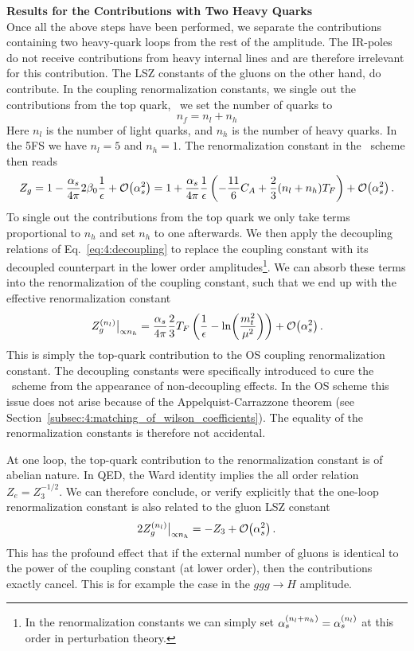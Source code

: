 \textbf{Results for the Contributions with Two Heavy Quarks} \\
Once all the above steps have been performed, we separate the contributions containing two heavy-quark loops from the rest of the amplitude. The \acs{IR}-poles do not receive contributions from heavy internal lines and are therefore irrelevant for this contribution. The LSZ constants of the gluons on the other hand, do contribute. In the coupling renormalization constants, we single out the contributions from the top quark, \ie\ we set the number of quarks to
\begin{equation}
n_f = n_l + n_h
\end{equation}
Here $n_l$ is the number of light quarks, and $n_h$ is the number of heavy quarks. In the 5\acs{FS} we have $n_l = 5$ and $n_h = 1$. The renormalization constant in the \MS\ scheme then reads
\begin{equation}
Z_g = 1 - \frac{\alpha_s}{4 \pi}  2 \beta_0 \frac{1}{\epsilon} + \mathcal{O}\!\left(\alpha_s^2\right) = 1 + \frac{\alpha_s}{4 \pi} \frac{1}{\epsilon} \left(- \frac{11}{6} C_A + \frac{2}{3} (n_l + n_h) T_F \right) + \mathcal{O}\!\left(\alpha_s^2\right).
\end{equation}
To single out the contributions from the top quark we only take terms proportional to $n_h$ and set $n_h$ to one afterwards. We then apply the decoupling relations of Eq.~\eqref{eq:4:decoupling} to replace the coupling constant with its decoupled counterpart in the lower order amplitudes\footnote{In the renormalization constants we can simply set $\alpha_s^{(n_l + n_h)} = \alpha_s^{(n_l)}$ at this order in perturbation theory.}. We can absorb these terms into the renormalization of the coupling constant, such that we end up with the effective renormalization constant
\begin{equation}
Z_g^{(n_l)} \big \vert_{\propto n_h} = \frac{\alpha_s}{4 \pi} \frac{2}{3} T_F \left(\frac{1}{\epsilon} - \ln\!\left(\frac{m_t^2}{\mu^2}\right) \right) + \mathcal{O}\!\left(\alpha_s^2\right).
\end{equation}
This is simply the top-quark contribution to the \acs{OS} coupling renormalization constant. The decoupling constants were specifically introduced to cure the \MS\ scheme from the appearance of non-decoupling effects. In the \acs{OS} scheme this issue does not arise because of the Appelquist-Carrazzone theorem (see Section~\ref{subsec:4:matching_of_wilson_coefficients}). The equality of the renormalization constants is therefore not accidental.

At one loop, the top-quark contribution to the renormalization constant is of abelian nature. In \acs{QED}, the Ward identity implies the all order relation $Z_e = Z_3^{-1/2}$. We can therefore conclude, or verify explicitly that the one-loop renormalization constant is also related to the gluon LSZ constant
\begin{equation}
2 Z_g^{(n_l)} \big \vert_{\propto n_h} = - Z_3 + \mathcal{O}\!\left(\alpha_s^2\right).
\end{equation}
This has the profound effect that if the external number of gluons is identical to the power of the coupling constant (at lower order), then the contributions exactly cancel. This is for example the case in the $ggg \rightarrow H$ amplitude.


